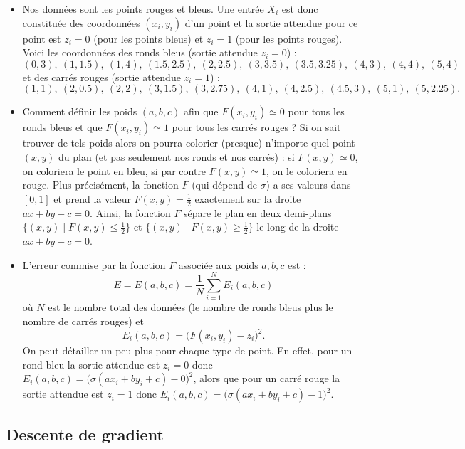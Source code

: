 {\begin{exemple}{}{}
\begin{itemize}
		
		
		\item Nos données sont les points rouges et bleus.
		Une entrée $X_i$ est donc constituée des coordonnées $(x_i,y_i)$ d'un point et la sortie attendue pour ce point est $z_i = 0$ (pour les points bleus) et $z_i = 1$ (pour les points rouges).
		Voici les coordonnées des ronds bleus (sortie attendue $z_i = 0$) :
		$$(0,3),\ (1,1.5),\ (1,4),\ (1.5,2.5),\ (2,2.5),\ (3,3.5),\ (3.5,3.25),\ (4,3),\ (4,4),\ (5,4)$$
		et des carrés rouges (sortie attendue $z_i = 1$) :
		$$(1,1),\ (2,0.5),\ (2,2),\ (3,1.5),\ (3,2.75),\ (4,1),\ (4,2.5),\ (4.5,3),\ (5,1),\ (5,2.25).$$  
		
		
		\item Comment définir les poids $(a,b,c)$ afin que $F(x_i,y_i) \simeq 0$ pour tous les ronds bleus et que $F(x_i,y_i)\simeq1$ pour tous les carrés rouges ? Si on sait trouver de tels poids alors on pourra colorier (presque) n'importe quel point $(x,y)$ du plan (et pas seulement nos ronds et nos carrés) : si $F(x,y) \simeq 0$, on coloriera le point en bleu, si par contre $F(x,y) \simeq 1$, on le coloriera en rouge.
		Plus précisément, la fonction $F$ (qui dépend de $\sigma$) a ses valeurs dans $[0,1]$ et prend la valeur $F(x,y)=\frac12$ exactement sur la droite $ax+by+c=0$. Ainsi, la fonction $F$ sépare le plan en deux demi-plans $\{ (x,y) \mid F(x,y)\le\frac12\}$ et $\{ (x,y) \mid F(x,y)\ge\frac12\}$ le long de la droite $ax+by+c=0$.
		
		\item L'erreur commise par la fonction $F$ associée aux poids $a,b,c$ est :
		$$E = E(a,b,c) = \frac{1}N \sum_{i=1}^N E_i(a,b,c)$$
		où $N$ est le nombre total des données (le nombre de ronds bleus plus le nombre de carrés rouges)
		et 
		$$E_i(a,b,c) = \big( F(x_i,y_i) - z_i \big)^2.$$
		On peut détailler un peu plus pour chaque type de point.
		En effet, pour un rond bleu la sortie attendue est $z_i=0$ donc $E_i(a,b,c) = \big( \sigma(a x_i + b y_i + c) - 0 \big)^2$, alors que pour un carré rouge la sortie attendue est $z_i=1$ donc $E_i(a,b,c) = \big( \sigma(a x_i + b y_i + c) - 1 \big)^2$.
		
	\end{itemize}
\end{exemple}


\subsection{Descente de gradient}

}
